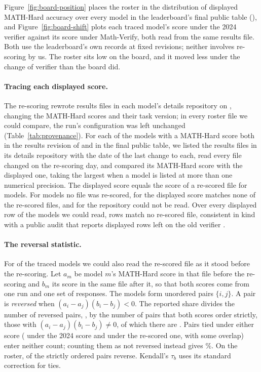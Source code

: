 Figure~\ref{fig:board-position} places the roster in the distribution of displayed MATH-Hard
accuracy over every model in the leaderboard's final public table (\BoardFinalTableDate{}), and
Figure~\ref{fig:board-shift} plots each traced model's score under the 2024 verifier against its
score under Math-Verify, both read from the same results file. Both use the leaderboard's own
records at fixed revisions; neither involves re-scoring by us. The roster sits low on the board,
and it moved less under the change of verifier than the board did.

\paragraph{Tracing each displayed score.}
The re-scoring rewrote results files in each model's details repository on \BoardRegradeDate{},
changing the MATH-Hard scores and their task version; in every roster file we could compare, the
run's configuration was left unchanged (Table~\ref{tab:provenance}). For each of the \BoardBothModels{} models with a MATH-Hard score both
in the results revision of \BoardPreRescoreDate{} and in the final public table, we listed the
results files in its details repository with the date of the last change to each, read every file
changed on the re-scoring day, and compared its MATH-Hard score with the displayed one, taking the
largest when a model is listed at more than one numerical precision. The displayed score equals the
score of a re-scored file for \BoardAttributable{} models. For \BoardNoRegraded{} models no file was
re-scored, for \BoardMismatch{} the displayed score matches none of the re-scored files, and for
\BoardUnavailable{} the repository could not be read. Over every displayed row of the models we could
read, \BoardStaleRows{} rows match no re-scored file, consistent in kind with a public audit that
reports displayed rows left on the old verifier \citep{oll2026discussion}.

\paragraph{The reversal statistic.}
For \BoardShiftModels{} of the traced models we could also read the re-scored file as it stood before
the re-scoring. Let $a_m$ be model $m$'s MATH-Hard score in that file before the re-scoring and
$b_m$ its score in the same file after it, so that both scores come from one run and one set of
responses. The \BoardShiftModels{} models form \BoardShiftPairs{} unordered pairs $\{i, j\}$. A
pair is \emph{reversed} when $(a_i - a_j)(b_i - b_j) < 0$. The reported share divides the number of
reversed pairs, \BoardShiftReversed{}, by the number of pairs that both scores order strictly,
those with $(a_i - a_j)(b_i - b_j) \neq 0$, of which there are \BoardShiftPairsStrict{}. Pairs tied
under either score (\BoardShiftTiedOld{} under the 2024 score and \BoardShiftTiedNew{} under the
re-scored one, with some overlap) enter neither count; counting them as not reversed instead gives
\BoardShiftReversedAllPct\%. On the roster, \RosterShiftReversed{} of the
\RosterShiftPairsStrict{} strictly ordered pairs reverse. Kendall's $\tau_b$ uses its standard
correction for ties.

